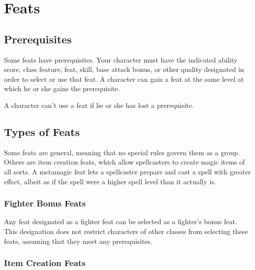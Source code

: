 \chapter{Feats}\label{chapter:Feats}

\section{Prerequisites}

Some feats have prerequisites. Your character must have the indicated ability score, 
class feature, feat, skill, base attack bonus, or other quality designated in order 
to select or use that feat. A character can gain a feat at the same level at which 
he or she gains the prerequisite.

A character can't use a feat if he or she has lost a prerequisite.

\section{Types of Feats}

Some feats are general, meaning that no special rules govern them as a group. Others 
are item creation feats, which allow spellcasters to create magic items of all 
sorts. A metamagic feat lets a spellcaster prepare and cast a spell with greater 
effect, albeit as if the spell were a higher spell level than it actually is.

\subsection{Fighter Bonus Feats}

Any feat designated as a fighter feat can be selected as a fighter's bonus feat. 
This designation does not restrict characters of other classes from selecting these 
feats, assuming that they meet any prerequisites.

\subsection{Item Creation Feats}

